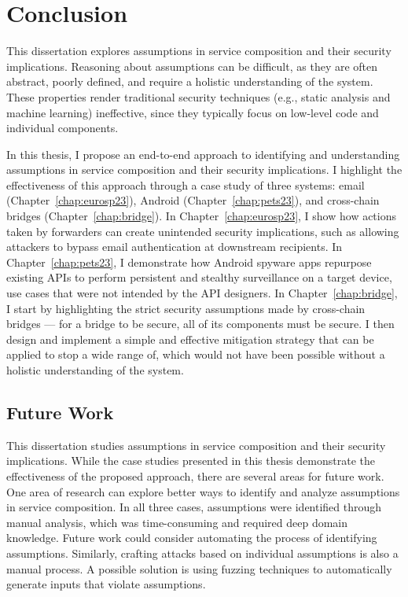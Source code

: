 
\chapter{Conclusion}
This dissertation explores assumptions in service composition and their security implications. Reasoning about assumptions can be difficult, as they are often abstract, poorly defined, and require a holistic understanding of the system. These properties render traditional security techniques (e.g., static analysis and machine learning) ineffective, since they typically focus on low-level code and individual components.

In this thesis, I propose an end-to-end approach to identifying and understanding assumptions in service composition and their security implications. I highlight the effectiveness of this approach through a case study of three systems: email (Chapter~\ref{chap:eurosp23}), Android (Chapter~\ref{chap:pets23}), and cross-chain bridges (Chapter~\ref{chap:bridge}). In Chapter~\ref{chap:eurosp23}, I show how actions taken by forwarders can create unintended security implications, such as allowing attackers to bypass email authentication at downstream recipients. In Chapter~\ref{chap:pets23}, I demonstrate how Android spyware apps repurpose existing APIs to perform persistent and stealthy surveillance on a target device, use cases that were not intended by the API designers. In Chapter~\ref{chap:bridge}, I start by highlighting the strict security assumptions made by cross-chain bridges --- for a bridge to be secure, all of its components must be secure. I then design and implement a simple and effective mitigation strategy that can be applied to stop a wide range of, which would not have been possible without a holistic understanding of the system.


\section{Future Work}
This dissertation studies assumptions in service composition and their security implications. While the case studies presented in this thesis demonstrate the effectiveness of the proposed approach, there are several areas for future work. One area of research can explore better ways to identify and analyze assumptions in service composition. In all three cases, assumptions were identified through manual analysis, which was time-consuming and required deep domain knowledge. Future work could consider automating the process of identifying assumptions. Similarly, crafting attacks based on individual assumptions is also a manual process. A possible solution is using fuzzing techniques to automatically generate inputs that violate assumptions.

